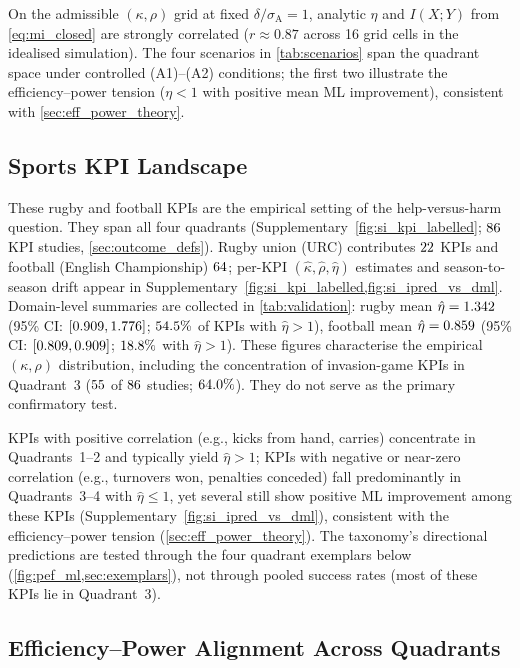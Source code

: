 On the admissible $(\kappa,\rho)$ grid at fixed $\delta/\sigma_{\mathrm{A}}=1$, analytic $\eta$ and $I(X;Y)$ from \cref{eq:mi_closed} are strongly correlated ($r\approx 0.87$ across 16 grid cells in the idealised simulation). The four scenarios in \cref{tab:scenarios} span the quadrant space under controlled (A1)--(A2) conditions; the first two illustrate the efficiency--power tension ($\eta<1$ with positive mean ML improvement), consistent with \cref{sec:eff_power_theory}.

\subsection{Sports KPI Landscape}

These rugby and football KPIs are the empirical setting of the help-versus-harm question. They span all four quadrants (Supplementary~\cref{fig:si_kpi_labelled}; $86{}$ KPI studies, \cref{sec:outcome_defs}). Rugby union ({URC}) contributes $22{}$ KPIs and football (English Championship) $64{}$; per-KPI $(\hat\kappa,\hat\rho,\hat\eta)$ estimates and season-to-season drift appear in Supplementary~\cref{fig:si_kpi_labelled,fig:si_ipred_vs_dml}. Domain-level summaries are collected in \cref{tab:validation}: rugby mean $\hat\eta=1.342$ (95\% CI: $[0.909,1.776]$; $54.5\%$ of KPIs with $\hat\eta>1$), football mean $\hat\eta=0.859$ (95\% CI: $[0.809,0.909]$; $18.8\%$ with $\hat\eta>1$). These figures characterise the empirical $(\kappa,\rho)$ distribution, including the concentration of invasion-game KPIs in Quadrant~3 ($55{}$ of $86{}$ studies; $64.0\%$). They do not serve as the primary confirmatory test.

KPIs with positive correlation (e.g., kicks from hand, carries) concentrate in Quadrants~1--2 and typically yield $\hat\eta>1$; KPIs with negative or near-zero correlation (e.g., turnovers won, penalties conceded) fall predominantly in Quadrants~3--4 with $\hat\eta\le 1$, yet several still show positive ML improvement among these KPIs (Supplementary~\cref{fig:si_ipred_vs_dml}), consistent with the efficiency--power tension (\cref{sec:eff_power_theory}). The taxonomy's directional predictions are tested through the four quadrant exemplars below (\cref{fig:pef_ml,sec:exemplars}), not through pooled success rates (most of these KPIs lie in Quadrant~3).

\subsection{Efficiency--Power Alignment Across Quadrants}
\label{sec:eff_power}

